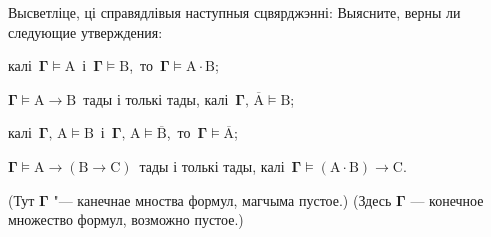\begin{problemList}
\smallskip

\problemItemWithCommonPartComplicated
{Высветліце, ці справядлівыя наступныя сцвярджэнні:}
{Выясните, верны ли следующие утверждения:}
{%
\begin{belarusianEnumerate}
    \item калі\, $\boldsymbol{\Gamma} \vDash \boldsymbol{\mathrm{A}}$\, і\, $\boldsymbol{\Gamma}
    \vDash \boldsymbol{\mathrm{B}}$,\, то\, $\boldsymbol{\Gamma} \vDash \boldsymbol{\mathrm{A}} \cdot
    \boldsymbol{\mathrm{B}}$;
    \item $\boldsymbol{\Gamma} \vDash \boldsymbol{\mathrm{A}} \to \boldsymbol{\mathrm{B}}$\, тады
    і толькі тады, калі\, $\boldsymbol{\Gamma},\, \overline{\boldsymbol{\mathrm{A}}} \vDash \boldsymbol{\mathrm{B}}$;
    \item калі\, $\boldsymbol{\Gamma},\, \boldsymbol{\mathrm{A}} \vDash \boldsymbol{\mathrm{B}}$\, і\,
    $\boldsymbol{\Gamma},\, \boldsymbol{\mathrm{A}} \vDash \overline{\boldsymbol{\mathrm{B}}}$,\, то\,
    $\boldsymbol{\Gamma} \vDash \overline{\boldsymbol{\mathrm{A}}}$;
    \item $\boldsymbol{\Gamma} \vDash \boldsymbol{\mathrm{A}} \to (\boldsymbol{\mathrm{B}}
    \to \boldsymbol{\mathrm{C}})$\, тады і толькі тады, калі\, $\boldsymbol{\Gamma} \vDash  (\boldsymbol{\mathrm{A}} \cdot \boldsymbol{\mathrm{B}}) \to \boldsymbol{\mathrm{C}}$.
\end{belarusianEnumerate}
}
{(Тут $\boldsymbol{\Gamma}$ "--- канечнае мноства формул, магчыма пустое.)}
{(Здесь $\boldsymbol{\Gamma}$ --- конечное множество формул, возможно пустое.)}

\end{problemList}


